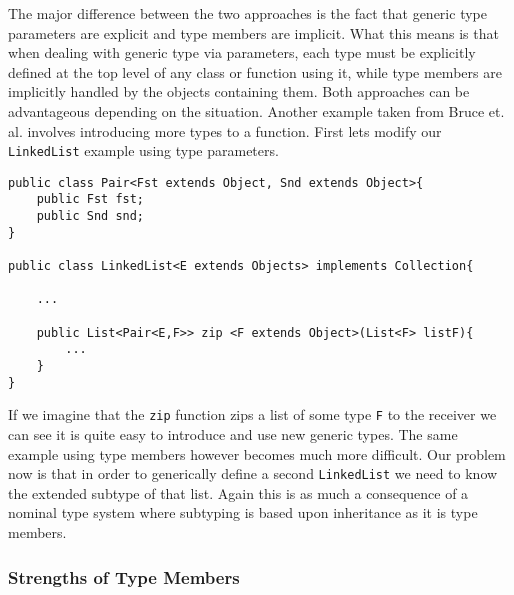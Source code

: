 \documentclass[11pt
              , a4paper
              , twoside
              , openright
              ]{report}
\numberwithin{case}{theorem}
\numberwithin{subcase}{case}
\begin{document}
The major difference between the two approaches is the fact that generic type parameters are explicit and type members are implicit. What this means is that when dealing with generic type via parameters, each type must be explicitly defined at the top level of any class or function using it, while type members are implicitly handled by the objects containing them. Both approaches can be advantageous depending on the situation. Another example taken from Bruce et. al. \cite{Bruce:1998:SSA:646155.679691} involves introducing more types to a function. First lets modify our \verb|LinkedList| example using type parameters.
\begin{lstlisting}[mathescape, style=custom_lang]
public class Pair<Fst extends Object, Snd extends Object>{
	public Fst fst;
	public Snd snd;
}

public class LinkedList<E extends Objects> implements Collection{

	...
	
	public List<Pair<E,F>> zip <F extends Object>(List<F> listF){
		...
	}	
}
\end{lstlisting}
If we imagine that the \verb|zip| function zips a list of some type \verb|F| to the receiver we can see it is quite easy to introduce and use new generic types. The same example using type members however becomes much more difficult. Our problem now is that in order to generically define a second \verb|LinkedList| we need to know the extended subtype of that list. Again this is as much a consequence of a nominal type system where subtyping is based upon inheritance as it is type members. 

\subsubsection{Strengths of Type Members}
\end{document}
